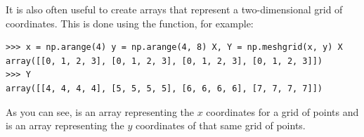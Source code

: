 It is also often useful to create arrays that represent a
two-dimensional grid of coordinates. This is done using the
 function, for example: \begin{lstlisting}
>>> x = np.arange(4) y = np.arange(4, 8) X, Y = np.meshgrid(x, y) X
array([[0, 1, 2, 3], [0, 1, 2, 3], [0, 1, 2, 3], [0, 1, 2, 3]])
>>> Y
array([[4, 4, 4, 4], [5, 5, 5, 5], [6, 6, 6, 6], [7, 7, 7, 7]])
\end{lstlisting} As you can see,  is an array representing the $x$
coordinates for a grid of points and  is an array representing the
$y$ coordinates of that same grid of points. 
